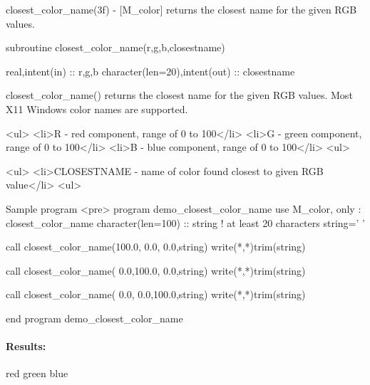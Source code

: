\begin{DoxyDescription}
\item[\label{_CLOSEST_COLOR_NAME}%
N\+A\+ME ]closest\+\_\+color\+\_\+name(3f) -\/ \mbox{[}M\+\_\+color\mbox{]} returns the closest name for the given R\+GB values. 


\item[S\+Y\+N\+O\+P\+S\+IS ]
\begin{DoxyPre}
    subroutine closest\_color\_name(r,g,b,closestname)\end{DoxyPre}



\begin{DoxyPre}     real,intent(in)               :: r,g,b
     character(len=20),intent(out) :: closestname
    \end{DoxyPre}
 


\item[D\+E\+S\+C\+R\+I\+P\+T\+I\+ON ]\begin{DoxyVerb}closest_color_name() returns the closest name for the given RGB values.
Most X11 Windows color names are supported.
\end{DoxyVerb}
 


\item[O\+P\+T\+I\+O\+NS ]\begin{DoxyVerb}<ul>
<li>R  - red component, range of 0 to 100</li>
<li>G  - green component, range of 0 to 100</li>
<li>B  - blue component, range of 0 to 100</li>
<ul>
\end{DoxyVerb}
 


\item[R\+E\+T\+U\+R\+NS ]\begin{DoxyVerb}<ul>
<li>CLOSESTNAME  - name of color found closest to given RGB value</li>
<ul>
\end{DoxyVerb}
 


\item[E\+X\+A\+M\+P\+LE ]\begin{DoxyVerb}Sample program
<pre>
   program demo_closest_color_name
   use M_color, only : closest_color_name
   character(len=100) :: string ! at least 20 characters
   string=' '

   call closest_color_name(100.0,  0.0,  0.0,string)
   write(*,*)trim(string)

   call closest_color_name(  0.0,100.0,  0.0,string)
   write(*,*)trim(string)

   call closest_color_name(  0.0,  0.0,100.0,string)
   write(*,*)trim(string)

   end program demo_closest_color_name
\end{DoxyVerb}


\paragraph*{Results\+:}

red green blue 




\end{DoxyDescription}

